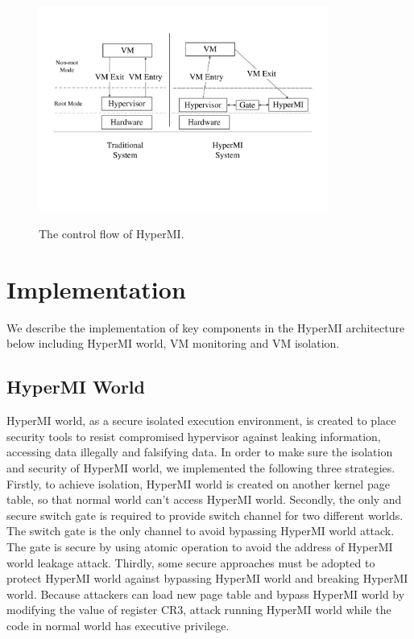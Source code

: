 \documentclass[conference]{IEEEtran}
\begin{document}
\begin{figure}
\centerline{\includegraphics[width=9.5cm, height=7.5cm]{pdfvmcsProcess.pdf}}
\caption{The control flow of HyperMI. } \label{fig+1}
\end{figure}


\section{Implementation}

We describe the implementation of key components in the HyperMI architecture below including HyperMI world, VM monitoring and VM isolation.

\subsection{HyperMI World} \label {HWorld}
HyperMI world, as a secure isolated execution environment, is created to place security tools to resist compromised hypervisor against leaking information, accessing data illegally and falsifying data. 
In order to make sure the isolation and security of HyperMI world, we implemented the following three strategies.
Firstly, to achieve isolation, HyperMI world is created on another kernel page table, so that normal world can't access HyperMI world. Secondly, the only and secure switch gate is required to provide switch channel for two different worlds. The switch gate is the only channel to avoid bypassing HyperMI world attack. The gate is secure by using atomic operation to avoid the address of HyperMI world leakage attack. Thirdly, some secure approaches must be adopted to protect HyperMI world against bypassing HyperMI world and breaking HyperMI world. Because attackers can load new page table and bypass HyperMI world by modifying the value of register CR3, attack running HyperMI world while the code in normal world has executive privilege.
\end{document}

